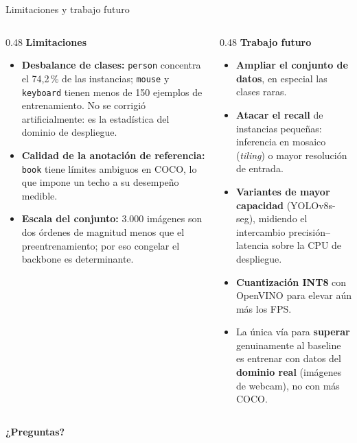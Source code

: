 \documentclass[aspectratio=169,11pt]{beamer}
\begin{document}
\begin{frame}{Limitaciones y trabajo futuro}
  \begin{columns}[T]
    \begin{column}{0.48\textwidth}
      \textbf{Limitaciones}
      \begin{itemize}\footnotesize
        \item \textbf{Desbalance de clases:} \texttt{person} concentra el 74,2\,\% de las
              instancias; \texttt{mouse} y \texttt{keyboard} tienen menos de 150 ejemplos
              de entrenamiento. No se corrigió artificialmente: es la estadística del
              dominio de despliegue.
        \item \textbf{Calidad de la anotación de referencia:} \texttt{book} tiene límites
              ambiguos en COCO, lo que impone un techo a su desempeño medible.
        \item \textbf{Escala del conjunto:} 3.000 imágenes son dos órdenes de magnitud
              menos que el preentrenamiento; por eso congelar el backbone es determinante.
      \end{itemize}
    \end{column}
    \begin{column}{0.48\textwidth}
      \textbf{Trabajo futuro}
      \begin{itemize}\footnotesize
        \item \textbf{Ampliar el conjunto de datos}, en especial las clases raras.
        \item \textbf{Atacar el recall} de instancias pequeñas: inferencia en mosaico
              (\emph{tiling}) o mayor resolución de entrada.
        \item \textbf{Variantes de mayor capacidad} (YOLOv8s-seg), midiendo el intercambio
              precisión--latencia sobre la CPU de despliegue.
        \item \textbf{Cuantización INT8} con OpenVINO para elevar aún más los FPS.
        \item[$\Rightarrow$] La única vía para \textbf{superar} genuinamente al baseline es
              entrenar con datos del \textbf{dominio real} (imágenes de webcam), no con
              más COCO.
      \end{itemize}
    \end{column}
  \end{columns}
  \vspace{0.3em}
  \centering
  {\Large\color{azul}\bfseries ¿Preguntas?}
\end{frame}
\end{document}
